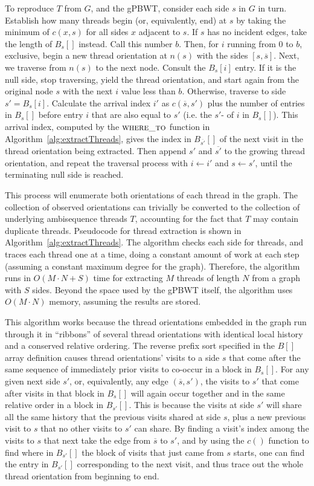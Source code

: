 To reproduce $T$ from $G$, and the gPBWT, consider each side $s$ in $G$ in turn. Establish how many threads begin (or, equivalently, end) at $s$ by taking the minimum of $c(x, s)$ for all sides $x$ adjacent to $s$. If $s$ has no incident edges, take the length of $B_s[]$ instead. Call this number $b$. Then, for $i$ running from 0 to $b$, exclusive, begin a new thread orientation at $n(s)$ with the sides $[s, \overline{s}]$. Next, we traverse from $n(s)$ to the next node. Consult the $B_s[i]$ entry. If it is the null side, stop traversing, yield the thread orientation, and start again from the original node $s$ with the next $i$ value less than $b$. Otherwise, traverse to side $s' = B_s[i]$. Calculate the arrival index $i'$ as $c(\overline{s}, s')$ plus the number of entries in $B_s[]$ before entry $i$ that are also equal to $s'$ (i.e. the $s'$- of $i$ in $B_s[]$). This arrival index, computed by the $\Call{where\_to}{}$ function in Algorithm~\ref{alg:extractThreads}, gives the index in $B_{\overline{s'}}[]$ of the next visit in the thread orientation being extracted.  Then append $s'$ and $\overline{s'}$ to the growing thread orientation, and repeat the traversal process with $i \leftarrow i'$ and $s \leftarrow s'$, until the terminating null side is reached. 

This process will enumerate both orientations of each thread in the graph. The collection of observed orientations can trivially be converted to the collection of underlying ambisequence threads $T$, accounting for the fact that $T$ may contain duplicate threads. Pseudocode for thread extraction is shown in Algorithm~\ref{alg:extractThreads}. The algorithm checks each side for threads, and traces each thread one at a time, doing a constant amount of work at each step (assuming a constant maximum degree for the graph). Therefore, the algorithm runs in $O(M \cdot N + S)$ time for extracting $M$ threads of length $N$ from a graph with $S$ sides. Beyond the space used by the gPBWT itself, the algorithm uses $O(M \cdot N)$ memory, assuming the results are stored.

This algorithm works because the thread orientations embedded in the graph run through it in ``ribbons'' of several thread orientations with identical local history and a conserved relative ordering. The reverse prefix sort specified in the $B[]$ array definition causes thread orientations' visits to a side $s$ that come after the same sequence of immediately prior visits to co-occur in a block in $B_s[]$. For any given next side $s'$, or, equivalently, any edge $(\overline{s}, s')$, the visits to $s'$ that come after visits in that block in $B_s[]$ will again occur together and in the same relative order in a block in $B_{s'}[]$. This is because the visits at side $s'$ will share all the same history that the previous visits shared at side $s$, plus a new previous visit to $s$ that no other visits to $s'$ can share. By finding a visit's index among the visits to $s$ that next take the edge from $\overline{s}$ to $s'$, and by using the $c()$ function to find where in $B_{s'}[]$ the block of visits that just came from $s$ starts, one can find the entry in $B_{s'}[]$ corresponding to the next visit, and thus trace out the whole thread orientation from beginning to end.

